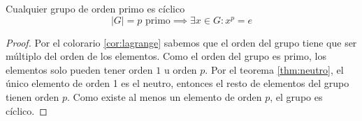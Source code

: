 \begin{thm}
    Cualquier grupo de orden primo es cíclico
    \begin{equation}
        |G| = p \text{ primo} \implies \exists x \in G : x^{p} = e 
    \end{equation}
\end{thm}

\begin{proof}
    Por el colorario \ref{cor:lagrange} sabemos que el orden del grupo tiene que ser múltiplo del orden de los elementos. Como el orden del grupo es primo, los elementos solo pueden tener orden $1$ u orden $p$. Por el teorema \ref{thm:neutro}, el único elemento de orden 1 es el neutro, entonces el resto de elementos del grupo tienen orden $p$. Como existe al menos un elemento de orden $p$, el grupo es cíclico.
\end{proof}
